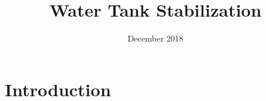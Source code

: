 \documentclass{article}
\title{Water Tank Stabilization}
\author{}
\date{December 2018}
\begin{document}
\maketitle

\section{Introduction}
\end{document}
